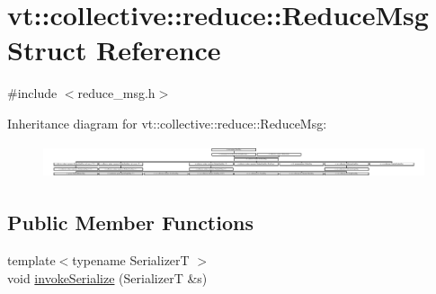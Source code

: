 \hypertarget{structvt_1_1collective_1_1reduce_1_1_reduce_msg}{}\section{vt\+:\+:collective\+:\+:reduce\+:\+:Reduce\+Msg Struct Reference}
\label{structvt_1_1collective_1_1reduce_1_1_reduce_msg}


{\ttfamily \#include $<$reduce\+\_\+msg.\+h$>$}

Inheritance diagram for vt\+:\+:collective\+:\+:reduce\+:\+:Reduce\+Msg\+:\begin{figure}[H]
\begin{center}
\leavevmode
\includegraphics[height=0.997625cm]{structvt_1_1collective_1_1reduce_1_1_reduce_msg}
\end{center}
\end{figure}
\subsection*{Public Member Functions}
\begin{DoxyCompactItemize}
\item 
{\footnotesize template$<$typename SerializerT $>$ }\\void \hyperlink{structvt_1_1collective_1_1reduce_1_1_reduce_msg_a6f5e84fca312804e6f9ae976947c63de}{invoke\+Serialize} (SerializerT \&s)
\end{DoxyCompactItemize}
